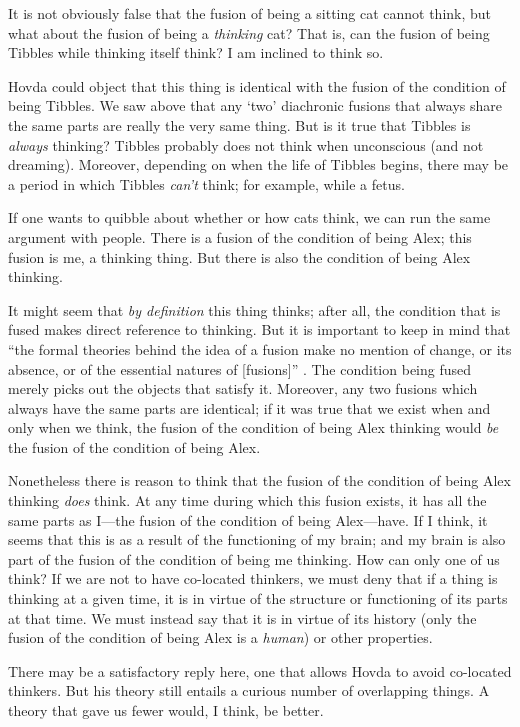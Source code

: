 \documentclass[11pt]{article}
\begin{document}
\begin{spacing}{1.5}
It is not obviously false that the fusion of being a sitting cat
cannot think, but what about the fusion of being a {\em thinking} cat?
That is, can the fusion of being Tibbles while thinking itself think?
I am inclined to think so.

Hovda could object that this thing is identical with the fusion of the
condition of being Tibbles.  We saw above that any `two' diachronic
fusions that always share the same parts are really the very same
thing.  But is it true that Tibbles is {\em always} thinking?  Tibbles
probably does not think when unconscious (and not dreaming).
Moreover, depending on when the life of Tibbles begins, there may be a
period in which Tibbles {\em can't} think; for example, while a fetus.

If one wants to quibble about whether or how cats think, we can run
the same argument with people.  There is a fusion of the condition of
being Alex; this fusion is me, a thinking thing.  But there is also
the condition of being Alex thinking.

It might seem that {\em by definition} this thing thinks; after all,
the condition that is fused makes direct reference to thinking.  But
it is important to keep in mind that ``the formal theories behind the
idea of a fusion make no mention of change, or its absence, or of the
essential natures of [fusions]'' \citep[sec. 1]{hovda2011}.  The
condition being fused merely picks out the objects that satisfy it.
Moreover, any two fusions which always have the same parts are
identical; if it was true that we exist when and only when we think,
the fusion of the condition of being Alex thinking would {\em be} the
fusion of the condition of being Alex.

Nonetheless there is reason to think that the fusion of the condition
of being Alex thinking {\em does} think.  At any time during which
this fusion exists, it has all the same parts as I---the fusion of the
condition of being Alex---have.  If I think, it seems that this is as
a result of the functioning of my brain; and my brain is also part of
the fusion of the condition of being me thinking.  How can only one of
us think?  If we are not to have co-located thinkers, we must deny
that if a thing is thinking at a given time, it is in virtue of the
structure or functioning of its parts at that time.  We must instead
say that it is in virtue of its history (only the fusion of the
condition of being Alex is a {\em human}) or other properties.

There may be a satisfactory reply here, one that allows Hovda to avoid
co-located thinkers.  But his theory still entails a curious number of
overlapping things.  A theory that gave us fewer would, I think, be
better.


\end{spacing}
\end{document}
